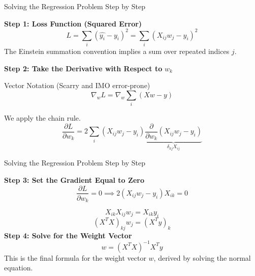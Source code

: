 \documentclass{beamer}
\begin{document}
\begin{frame}{Solving the Regression Problem Step by Step}

\textbf{Step 1: Loss Function (Squared Error)}
\[
L = \sum_i (\hat{y_i} - y_i)^2 = \sum_i (X_{ij} w_j - y_i)^2
\]
The Einstein summation convention implies a sum over repeated indices \(j\).

\textbf{Step 2: Take the Derivative with Respect to} \( w_k \)

Vector Notation (Scarry and IMO error-prone)
\[
\nabla_w L = \nabla_w  \sum_i (X  w - y) 
\]


We apply the chain rule. 
\[
\frac{\partial L}{\partial w_k} = 2 \sum_i (X_{ij} w_j - y_i) 
\underbrace{\frac{\partial}{\partial w_k} (X_{ij} w_j - y_i)}_{\delta_{kj} X_{ij}}
\]


\end{frame}

\begin{frame}{Solving the Regression Problem Step by Step}

\textbf{Step 3: Set the Gradient Equal to Zero}
\[
\frac{\partial L}{\partial w_k} = 0 \implies 2 (X_{ij} w_j - y_i) X_{ik} = 0
\]

\[
X_{ik} X_{ij} w_j = X_{ik} y_i
\]
\[
(X^T X)_{kj} w_j = (X^T y)_k
\]
\textbf{Step 4: Solve for the Weight Vector}
\[
w = (X^T X)^{-1} X^T y
\]
This is the final formula for the weight vector \(w\), derived by solving the normal equation.

\end{frame}
\end{document}
